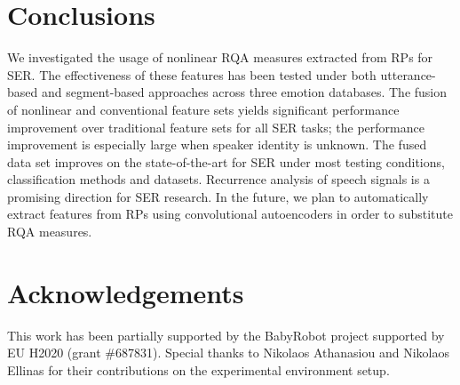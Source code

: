 \documentclass[a4paper]{article}
\begin{document}
\section{Conclusions}
We investigated the usage of nonlinear RQA measures extracted from RPs for SER. The effectiveness of these features has been tested under both utterance-based and segment-based approaches across three emotion databases. The fusion of nonlinear and conventional feature sets yields significant performance improvement over traditional feature sets for all SER tasks; the performance improvement is especially large when speaker identity is unknown. The fused data set improves on the state-of-the-art for SER under most testing conditions, classification methods and datasets. Recurrence analysis of speech signals is a promising direction for SER research. In the future, we plan to automatically extract features from RPs using convolutional autoencoders in order to substitute RQA measures. 





















































\section{Acknowledgements}
This work has been partially supported by the BabyRobot project supported by EU H2020 (grant \#687831). Special thanks to Nikolaos Athanasiou and Nikolaos Ellinas for their contributions on the experimental environment setup.





\end{document}

